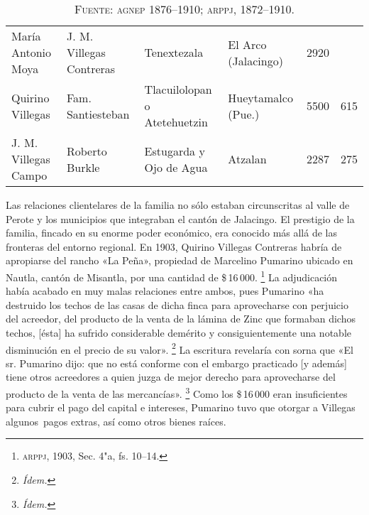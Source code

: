 \documentclass[14pt,twoside,final]{extbook} %
\let\oldfootnote\footnote
\renewcommand\footnote[1]{%
\oldfootnote{\hspace{1mm}#1}}
\begin{document}
\begin{sidewaystable}
\begin{tabular}{@{}llllrr@{}}
María Antonio Moya\index[nombres]{Antonio Moya, Maria@Antonio Moya, María} & J. M. Villegas Contreras & Tenextezala\index[lugares]{Tenextezala} & El Arco\index[lugares]{Arco, El} (Jalacingo)\index[lugares]{Jalacingo} & 2920 & {} \\
Quirino Villegas & Fam. Santiesteban\index[nombres]{Santiesteban!familia} & Tlacuilolopan\index[lugares]{Tlacuilolopan|see{Atetehuetzin}} o Atetehuetzin\index[lugares]{Atetehuetzin} & Hueytamalco (Pue.) & 5500 & 615 \\
J. M. Villegas Campo & Roberto Burkle\index[nombres]{Burkle, Roberto} & Estugarda\index[lugares]{Estugarda} y Ojo de Agua\index[lugares]{Ojo de Agua} & Atzalan\index[lugares]{Atzalan} & 2287 & 275 \\
\bottomrule
\end{tabular}
\caption*{\textsc{Fuente:} \textsc{agnep} 1876--1910; \textsc{arppj}, 1872--1910.}
\label{tab:ranchos-villegas}
\end{sidewaystable}\protect\enlargethispage*{\baselineskip}

Las relaciones clientelares de la familia no sólo estaban circunscritas al valle de Perote y los municipios que integraban el cantón de Jalacingo. El prestigio de la familia, fincado en su enorme poder económico, era conocido más allá de las fronteras del entorno regional. En 1903, Quirino Villegas Contreras habría de apropiarse del rancho «La Peña», propiedad de Marcelino Pumarino ubicado en Nautla, cantón de Misantla, por una cantidad de \$\,16\,000.\footnote{\textsc{arppj}, 1903, Sec. 4"a, fs. 10--14.} La adjudicación había acabado en muy malas relaciones entre ambos, pues Pumarino «ha destruido los techos de las casas de dicha finca para aprovecharse con perjuicio del acreedor, del producto de la venta de la lámina de Zinc que formaban dichos techos, [ésta] ha sufrido considerable demérito y consiguientemente una notable disminución en el precio de su valor».\footnote{\em Ídem.} La escritura revelaría con sorna que «El sr. Pumarino dijo: que no está conforme con el embargo practicado [y además] tiene otros acreedores a quien juzga de mejor derecho para aprovecharse del producto de la venta de las mercancías».\footnote{\em Ídem.} Como los \$\,16\,000 eran insuficientes para cubrir el pago del capital e intereses, Pumarino tuvo que otorgar a Villegas algunos~pagos extras, así como otros bienes raíces.
\end{document}
